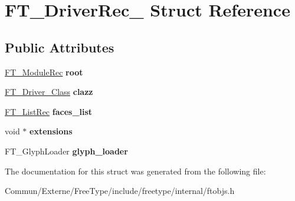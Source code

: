 \hypertarget{struct_f_t___driver_rec__}{}\section{F\+T\+\_\+\+Driver\+Rec\+\_\+ Struct Reference}
\label{struct_f_t___driver_rec__}
\subsection*{Public Attributes}
\begin{DoxyCompactItemize}
\item 
\hyperlink{struct_f_t___module_rec__}{F\+T\+\_\+\+Module\+Rec} {\bfseries root}\hypertarget{struct_f_t___driver_rec___a8451ceb25c76794fb47e81f477c8222d}{}\label{struct_f_t___driver_rec___a8451ceb25c76794fb47e81f477c8222d}

\item 
\hyperlink{struct_f_t___driver___class_rec__}{F\+T\+\_\+\+Driver\+\_\+\+Class} {\bfseries clazz}\hypertarget{struct_f_t___driver_rec___a3111153608e5abeb093ed5eb7fef5aec}{}\label{struct_f_t___driver_rec___a3111153608e5abeb093ed5eb7fef5aec}

\item 
\hyperlink{struct_f_t___list_rec__}{F\+T\+\_\+\+List\+Rec} {\bfseries faces\+\_\+list}\hypertarget{struct_f_t___driver_rec___a2602170e3ecde21a764dc32417aaa002}{}\label{struct_f_t___driver_rec___a2602170e3ecde21a764dc32417aaa002}

\item 
void $\ast$ {\bfseries extensions}\hypertarget{struct_f_t___driver_rec___ad2f1c1a800723dc887dcbc7ce78203d8}{}\label{struct_f_t___driver_rec___ad2f1c1a800723dc887dcbc7ce78203d8}

\item 
F\+T\+\_\+\+Glyph\+Loader {\bfseries glyph\+\_\+loader}\hypertarget{struct_f_t___driver_rec___ac28e7adbc14ee82c2b7710d0ee5541e2}{}\label{struct_f_t___driver_rec___ac28e7adbc14ee82c2b7710d0ee5541e2}

\end{DoxyCompactItemize}


The documentation for this struct was generated from the following file\+:\begin{DoxyCompactItemize}
\item 
Commun/\+Externe/\+Free\+Type/include/freetype/internal/ftobjs.\+h\end{DoxyCompactItemize}
